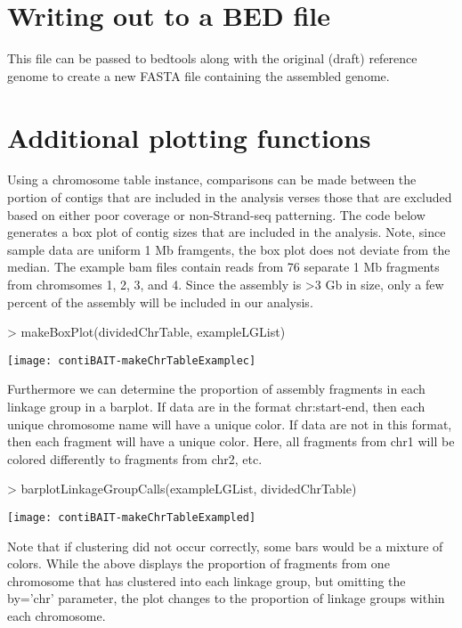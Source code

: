 \documentclass{article}
\begin{document}
\section{Writing out to a BED file}
This file can be passed to bedtools along with the original (draft) reference genome to create a new FASTA file containing the assembled genome.

\section{Additional plotting functions}

Using a chromosome table instance, comparisons can be made between the portion of contigs that are included in the analysis verses those that are excluded based on either poor coverage or non-Strand-seq patterning. The code below generates a box plot of contig sizes that are included in the analysis. Note, since sample data are uniform 1 Mb framgents, the box plot does not deviate from the median.  The example bam files contain reads from 76 separate 1 Mb fragments from chromsomes 1, 2, 3, and 4.  Since the assembly is >3 Gb in size, only a few percent of the assembly will be included in our analysis.

\begin{Schunk}
\begin{Sinput}
> makeBoxPlot(dividedChrTable, exampleLGList)
\end{Sinput}
\end{Schunk}
\texttt{[image: contiBAIT-makeChrTableExamplec]}

Furthermore we can determine the proportion of assembly fragments in each linkage group in a barplot. If data are in the format chr:start-end, then each unique chromosome name will have a unique color. If data are not in this format, then each fragment will have a unique color.  Here, all fragments from chr1 will be colored differently to fragments from chr2, etc.

\begin{Schunk}
\begin{Sinput}
> barplotLinkageGroupCalls(exampleLGList, dividedChrTable)
\end{Sinput}
\end{Schunk}
\texttt{[image: contiBAIT-makeChrTableExampled]}

Note that if clustering did not occur correctly, some bars would be a mixture of colors.  While the above displays the proportion of fragments from one chromosome that has clustered into each linkage group, but omitting the by='chr' parameter, the plot changes to the proportion of linkage groups within each chromosome.
\end{document}
